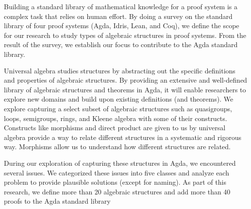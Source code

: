 Building a standard library of mathematical knowledge for a proof system is a
complex task that relies on human effort. By doing a survey on the standard library
of four proof systems (Agda, Idris, Lean, and Coq), we define the scope for our
research to study types of algebraic structures in proof systems. From the
result of the survey, we establish our focus to contribute to the Agda standard
library. 

Universal algebra studies structures by abstracting out the specific definitions
and properties of algebraic structures. By providing an extensive and
well-defined library of algebraic structures and theorems in Agda, it will
enable researchers to explore new domains and build upon existing definitions
(and theorems). We explore capturing a select subset of algebraic structures
such as quasigroups, loops, semigroups, rings, and Kleene algebra with some of
their constructs. Constructs like morphisms and direct product are given to us
by universal algebra provide a way to relate different structures in a
systematic and rigorous way. Morphisms allow us to understand how different
structures are related.

During our exploration of capturing these structures in Agda, we encountered
several issues. We categorized these issues into five classes and analyze each
problem to provide plausible solutions (except for naming). As part
of this research, we define more than 20 algebraic structures and add more than
40 proofs to the Agda standard library
